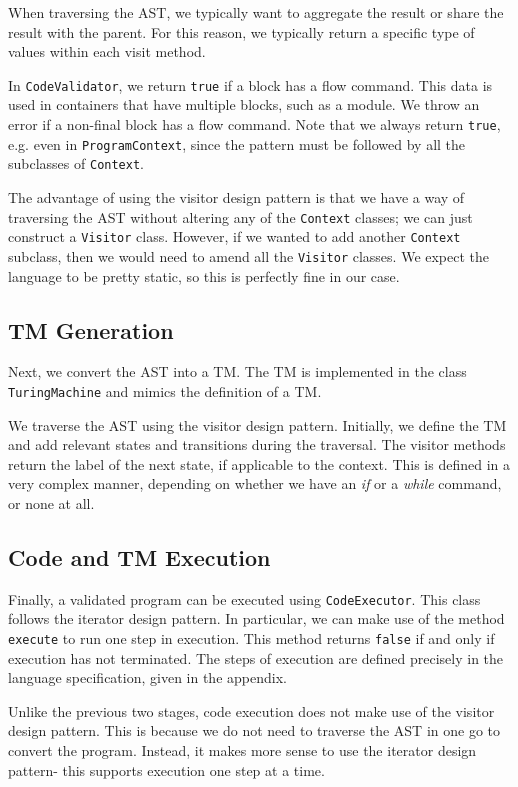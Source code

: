 When traversing the AST, we typically want to aggregate the result or share the result with the parent. For this reason, we typically return a specific type of values within each visit method. 

In \texttt{CodeValidator}, we return \texttt{true} if a block has a flow command. This data is used in containers that have multiple blocks, such as a module. We throw an error if a non-final block has a flow command. Note that we always return \texttt{true}, e.g. even in \texttt{ProgramContext}, since the pattern must be followed by all the subclasses of \texttt{Context}. 

The advantage of using the visitor design pattern is that we have a way of traversing the AST without altering any of the \texttt{Context} classes; we can just construct a \texttt{Visitor} class. However, if we wanted to add another \texttt{Context} subclass, then we would need to amend all the \texttt{Visitor} classes. We expect the language to be pretty static, so this is perfectly fine in our case.


\subsection{TM Generation}
Next, we convert the AST into a TM. The TM is implemented in the class \texttt{TuringMachine} and mimics the definition of a TM.

We traverse the AST using the visitor design pattern. Initially, we define the TM and add relevant states and transitions during the traversal. The visitor methods return the label of the next state, if applicable to the context. This is defined in a very complex manner, depending on whether we have an \textit{if} or a \textit{while} command, or none at all.

\subsection{Code and TM Execution}
Finally, a validated program can be executed using \texttt{CodeExecutor}. This class follows the iterator design pattern. In particular, we can make use of the method \texttt{execute} to run one step in execution. This method returns \texttt{false} if and only if execution has not terminated. The steps of execution are defined precisely in the language specification, given in the appendix.

Unlike the previous two stages, code execution does not make use of the visitor design pattern. This is because we do not need to traverse the AST in one go to convert the program. Instead, it makes more sense to use the iterator design pattern- this supports execution one step at a time.

